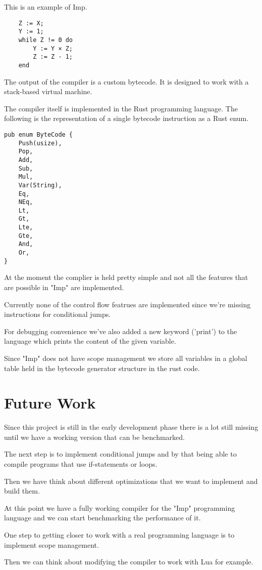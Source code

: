 \documentclass{article}
\begin{document}
This is an example of Imp.
\begin{verbatim}
    Z := X;
    Y := 1;
    while Z != 0 do
        Y := Y × Z;
        Z := Z - 1;
    end
\end{verbatim}

The output of the compiler is a custom bytecode. It is designed to work with a
stack-based virtual machine.

The compiler itself is implemented in the Rust programming language. The
following is the representation of a single bytecode instruction as a Rust
enum.

\begin{verbatim}
pub enum ByteCode {
    Push(usize),
    Pop,
    Add,
    Sub,
    Mul,
    Var(String),
    Eq,
    NEq,
    Lt,
    Gt,
    Lte,
    Gte,
    And,
    Or,
}
\end{verbatim}

At the moment the complier is held pretty simple and not all the features that
are possible in "Imp" are implemented. 

Currently none of the control flow featrues are implemented since we're missing
instructions for conditional jumps.

For debugging convenience we've also added a new keyword ('print') to the
language which prints the content of the given variable.

Since "Imp" does not have scope management we store all variables in a global
table held in the bytecode generator structure in the rust code.

\section{Future Work}
Since this project is still in the early development phase there is a lot still
missing until we have a working version that can be benchmarked.

The next step is to implement conditional jumps and by that being able
to compile programs that use if-statements or loops.

Then we have think about different optimizations that we want to implement and 
build them.

At this point we have a fully working compiler for the "Imp" programming language
and we can start benchmarking the performance of it.

One step to getting closer to work with a real programming language is to
implement scope management.

Then we can think about modifying the compiler to work with Lua for example.

\clearpage


\end{document}
